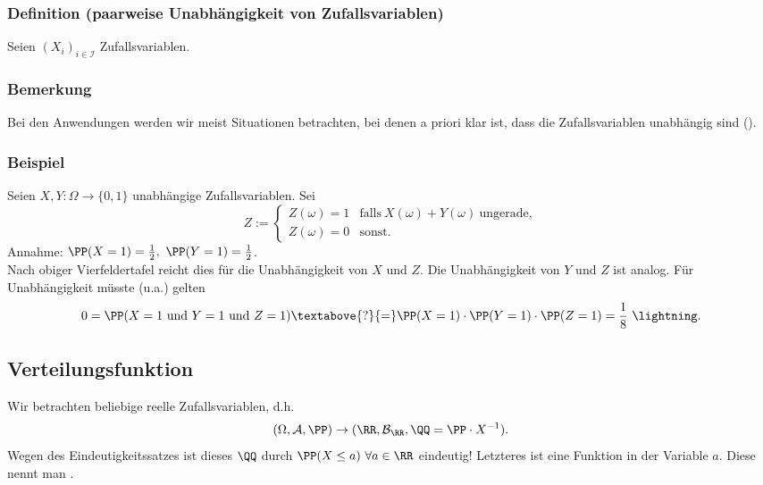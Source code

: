 \subsubsection{Definition (paarweise Unabh\"angigkeit von Zufallsvariablen)}
Seien $(X_i)_{i\in\mathcal{I}}$ Zufallsvariablen.
\subsubsection{Bemerkung}
Bei den Anwendungen werden wir meist Situationen betrachten, bei denen a priori klar ist, dass die Zufallsvariablen unabh\"angig sind ().
\subsubsection{Beispiel}
Seien $X,Y\colon\Omega\to\{0,1\}$ unabh\"angige Zufallsvariablen. Sei
\[Z:=\begin{cases}Z(\omega)=1&\text{falls}\ X(\omega)+Y(\omega)\ \text{ungerade},\\Z(\omega)=0&\text{sonst.}\end{cases}\]
Annahme: $\PP(X=1)=\frac{1}{2},\ \PP(Y=1)=\frac{1}{2}$.\\
Nach obiger Vierfeldertafel reicht dies f\"ur die Unabh\"angigkeit von $X$ und $Z$. Die Unabh\"angigkeit von $Y$ und $Z$ ist analog. F\"ur Unabh\"angigkeit m\"usste (u.a.) gelten
\[0=\PP(X=1\ \text{und}\ Y=1\ \text{und}\ Z=1)\textabove{?}{=}\PP(X=1)\cdot\PP(Y=1)\cdot\PP(Z=1)=\frac{1}{8}\ \lightning.\]
\subsection{Verteilungsfunktion}
Wir betrachten beliebige reelle Zufallsvariablen, d.h.
\[(\Omega,\mathcal{A},\PP)\to(\RR,\mathcal{B}_\RR,\QQ=\PP\cdot X^{-1}).\]
Wegen des Eindeutigkeitssatzes ist dieses $\QQ$ durch $\PP(X\leq a)\ \forall a\in\RR$ eindeutig! Letzteres ist eine Funktion in der Variable $a$. Diese nennt man .
